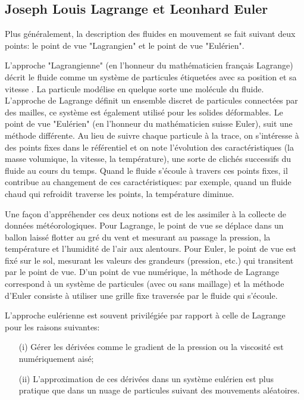 \documentclass[11pt]{article}
\begin{document}
\subsection{Joseph Louis Lagrange et Leonhard Euler}

Plus généralement, la description des fluides en mouvement se fait suivant deux points: le point de vue "Lagrangien" et le point de vue "Eulérien".

L'approche "Lagrangienne" (en l'honneur du mathématicien français Lagrange) décrit le fluide comme un système de particules étiquetées avec sa position  et sa vitesse . La particule modélise en quelque sorte une molécule du fluide. L'approche de Lagrange définit un ensemble discret de particules connectées par des mailles, ce système est également utilisé pour les solides déformables.\newline
Le point de vue "Eulérien" (en l'honneur du mathématicien suisse Euler), suit une méthode différente. Au lieu de suivre chaque particule à la trace, on s'intéresse à des points fixes dans le référentiel et on note l'évolution des caractéristiques (la masse volumique, la vitesse, la température), une sorte de clichés successifs du fluide au cours du temps. Quand le fluide s'écoule à travers ces points fixes, il contribue au changement de ces caractéristiques: par exemple, quand un fluide chaud qui refroidit traverse les points, la température diminue.

Une façon d'appréhender ces deux notions est de les assimiler à la collecte de données météorologiques. Pour Lagrange, le point de vue se déplace dans un ballon laissé flotter au gré du vent et mesurant au passage la pression, la température et l'humidité de l'air aux alentours. Pour Euler, le point de vue est fixé sur le sol, mesurant les valeurs des grandeurs (pression, etc.) qui transitent par le point de vue. \newline
D'un point de vue numérique, la méthode de Lagrange correspond à un système de particules (avec ou sans maillage) et la méthode d'Euler consiste à utiliser une grille fixe traversée par le fluide qui s'écoule.

L'approche eulérienne est souvent privilégiée par rapport à celle de Lagrange pour les raisons suivantes:
	\begin{enumerate}
	\item[(i)] Gérer les dérivées comme le gradient de la pression ou la viscosité est numériquement aisé; 
	\item[(ii)] L'approximation de ces dérivées dans un système eulérien est plus pratique que dans un nuage de particules suivant des mouvements aléatoires.\newline
	\end{enumerate}
\end{document}
